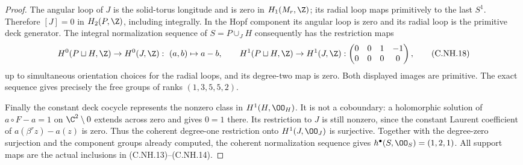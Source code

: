 \begin{proof}
The angular loop of $J$ is the solid-torus longitude and
is zero in $H_1(M_r,\Z)$; its radial loop maps primitively
to the last $S^1$. Therefore $[J]=0$ in $H_2(P,\Z)$,
including integrally. In the Hopf component its angular
loop is zero and its radial loop is the primitive deck
generator. The integral normalization sequence of
$S=P\cup_JH$ consequently has the restriction maps
\[
 H^0(P\sqcup H,\Z)\to H^0(J,\Z):\ (a,b)\mapsto a-b,
 \qquad
 H^1(P\sqcup H,\Z)\to H^1(J,\Z):
 \begin{pmatrix}0&0&1&-1\\0&0&0&0\end{pmatrix},
                                                        \tag{C.NH.18}
\]
up to simultaneous orientation choices for the radial
loops, and its degree-two map is zero. Both displayed
images are primitive. The exact sequence gives precisely
the free groups of ranks $(1,3,5,5,2)$.

Finally the constant deck cocycle represents the nonzero
class in $H^1(H,\OO_H)$. It is not a coboundary: a
holomorphic solution of $a\circ F-a=1$ on $\C^2\setminus0$
extends across zero and gives $0=1$ there. Its restriction
to $J$ is still nonzero, since the constant Laurent
coefficient of $a(\beta^r z)-a(z)$ is zero. Thus the
coherent degree-one restriction onto $H^1(J,\OO_J)$
is surjective. Together with the degree-zero surjection
and the component groups already computed, the coherent
normalization sequence gives $h^\bullet(S,\OO_S)=(1,2,1)$.
All support maps are the actual inclusions in (C.NH.13)--(C.NH.14).
\end{proof}

